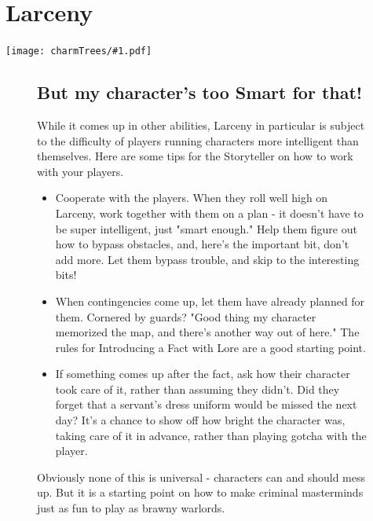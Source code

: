 \documentclass[oneside]{book}
\newlength{\sidewidth}
\newenvironment{sidebarPartial}[2][]{%
   \def\imgcmd{\texttt{[image: \#2]}}%
   \begin{lrbox}{\mysavebox}%
   \begin{minipage}%
}{%
   \end{minipage}
   \end{lrbox}%
   \sbox\mysavebox{\fbox{\usebox\mysavebox}}%
   \mbox{\rlap{\raisebox{-\dp\mysavebox}{\imgcmd}}\usebox\mysavebox}%
}
\newenvironment{sidebar}[1]{%
  \begin{figure}[tb]%
  \begin{sidebarPartial}{resources/bg-sidebar.jpg}{\textwidth}%
  \vspace{6pt}
  \subsection*{#1}\vspace{6pt}%
  \centering
  \begin{minipage}{\sidewidth}
}
{
  \end{minipage}
  \vspace{6pt}
  \end{sidebarPartial}
  \end{figure}
}
\newenvironment{Ability}[1]{%
  \section{#1}%
  \vspace{-0.25in}\texttt{[image: charmTrees/\#1.pdf]}%
  \begin{multicols}{2}
}
{
  \end{multicols}
}
\begin{document}
\begin{Ability}{Larceny}
\begin{sidebar}{But my character's too Smart for that!}
  While it comes up in other abilities, Larceny in particular is subject to the difficulty of players running characters more intelligent than themselves. Here are some tips for the Storyteller on how to work with your players.

  \begin{itemize}
    \item Cooperate with the players. When they roll well high on Larceny, work together with them on a plan - it doesn't have to be super intelligent, just "smart enough." Help them figure out how to bypass obstacles, and, here's the important bit, don't add more. Let them bypass trouble, and skip to the interesting bits!
    \item When contingencies come up, let them have already planned for them. Cornered by guards? "Good thing my character memorized the map, and there's another way out of here." The rules for Introducing a Fact with Lore are a good starting point.
    \item If something comes up after the fact, ask how their character took care of it, rather than assuming they didn't. Did they forget that a servant's dress uniform would be missed the next day? It's a chance to show off how bright the character was, taking care of it in advance, rather than playing gotcha with the player.
  \end{itemize}

  Obviously none of this is universal - characters can and should mess up. But it is a starting point on how to make criminal masterminds just as fun to play as brawny warlords.
\end{sidebar}


\end{Ability}
\end{document}
